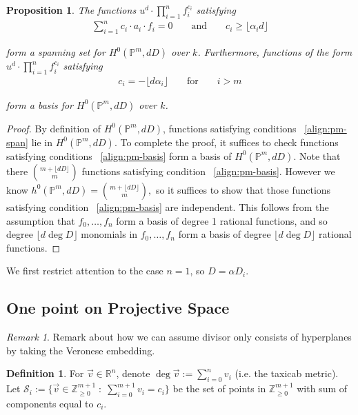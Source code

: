 \documentclass{amsart}
\theoremstyle{plain}
\newtheorem{prop}[thm]{Proposition}
\theoremstyle{definition}
\newtheorem{defn}[thm]{Definition}
\theoremstyle{remark}
\newtheorem{rem}[thm]{Remark}
\numberwithin{equation}{section}
\newcommand\ssec{\subsection}
\newcommand\br{{\mathbb R}}
\newcommand\bp{{\mathbb P}}
\newcommand\bz{{\mathbb Z}}
\newcommand\bida{a}
\newcommand\mss{\mathscr{S}}
\begin{document}
\begin{prop}
\label{prop:pm-span-and-basis}
The functions $u^d \cdot \prod_{i=1}^n f_i^{c_i}$ satisfying
\begin{align}
\label{align:pm-span}
\sum_{i=1}^{n} c_i \cdot \bida_i \cdot f_i = 0 && \text{ and } &&c_i \geq \lfloor \alpha_i d\rfloor	
\end{align}

\noindent
form a spanning set for $H^0(\bp^m, dD)$ over $k$. Furthermore, functions 
of the form $u^d \cdot \prod_{i=1}^n f_i^{c_i}$ satisfying
\begin{align}
\label{align:pm-basis}
c_i = -\lfloor d\alpha_i \rfloor && \text{ for } && i > m
\end{align}

\noindent
form a basis for $H^0(\bp^m, dD)$ over $k$.
\end{prop}

\begin{proof}
By definition of $H^0(\bp^m,dD)$, functions satisfying conditions 
~\eqref{align:pm-span} lie in $H^0(\bp^m,dD)$. To complete the proof, it suffices to check functions satisfying conditions ~\eqref{align:pm-basis} form a basis of $H^0(\bp^m,dD)$. Note that there $\binom{m+ \lfloor dD \rfloor }{m}$ functions satisfying condition ~\eqref{align:pm-basis}. However we know $h^0(\bp^m,dD) = \binom{m+ \lfloor dD \rfloor }{m},$ so it suffices to show that those functions satisfying condition ~\eqref{align:pm-basis} are independent. This follows from the assumption that $f_0,\ldots, f_n$ form a basis of degree 1 rational functions, and so degree $\lfloor d \deg D \rfloor $ monomials in $f_0,\ldots, f_n$ form a basis of degree $\lfloor d \deg D \rfloor $ rational functions.
\end{proof}

We first restrict attention to the case $n=1$, so $D = \alpha D_i$.

\ssec{One point on Projective Space}
\label{ssec:proj-one-point}

\begin{rem}
Remark about how we can assume divisor only consists of hyperplanes
by taking the Veronese embedding.
\end{rem}

\begin{defn}
\label{defn:vec-sum}
For $\vec{v} \in \br^n$, denote $\deg \vec{v} := \sum_{i = 0}
^n v_i$ (i.e. the taxicab metric).
Let $\mss_i := \{\vec{v} \in \bz_{\geq 0}^{m + 1} \; : \;
\sum_{i = 0} ^{m + 1} v_i = c_i\}$ be the set of points in
$\bz_{\geq 0}^{m + 1}$ with sum of components equal to $c_i$.
\end{defn}
\end{document}
